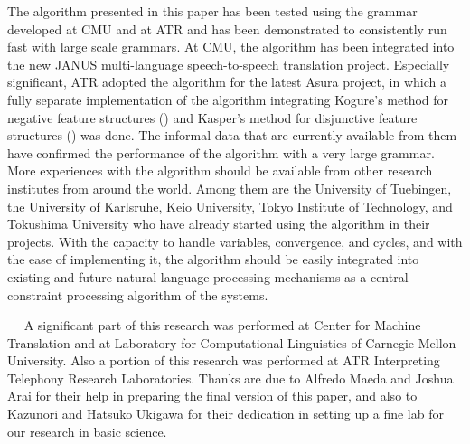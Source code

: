   The algorithm presented in this paper has been tested using the
grammar developed at CMU and at ATR and has been demonstrated to
consistently run fast with large scale grammars. At CMU, the algorithm
has been integrated into the new JANUS multi-language speech-to-speech
translation project.  Especially significant, ATR adopted the
algorithm for the latest {\sc Asura} project, in which a fully
separate implementation of the algorithm integrating Kogure's method
for negative feature structures (\cite{negative}) and Kasper's method
for disjunctive feature structures (\cite{Kasper}) was done.  The
informal data that are currently available from them have confirmed the
performance of the algorithm with a very large grammar.  More
experiences with the algorithm should be available from other research
institutes from around the world. Among them are the University of
Tuebingen, the University of Karlsruhe, Keio University, Tokyo
Institute of Technology, and Tokushima University who have already
started using the algorithm in their projects.  With the capacity to
handle variables, convergence, and cycles, and with the ease of
implementing it, the algorithm should be easily integrated into
existing and future natural language processing mechanisms as a
central constraint processing algorithm of the systems.



\acknowledgment
~ ~A significant part of this research was performed at Center for
Machine Translation and at Laboratory for Computational Linguistics of
Carnegie Mellon University. Also a portion of this research was
performed at ATR Interpreting Telephony Research Laboratories. Thanks
are due to Alfredo Maeda and Joshua Arai for their help in preparing
the final version of this paper, and also to Kazunori and Hatsuko Ukigawa 
for their dedication in setting up a fine lab for our research in
basic science.





